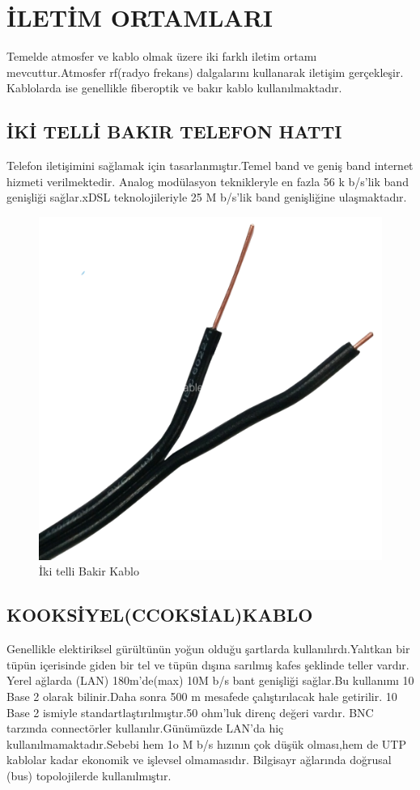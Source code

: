 \section{İLETİM ORTAMLARI}
Temelde atmosfer ve kablo olmak üzere iki farklı iletim ortamı mevcuttur.Atmosfer rf(radyo frekans) dalgalarını kullanarak  iletişim gerçekleşir.
Kablolarda ise genellikle fiberoptik ve bakır kablo kullanılmaktadır.

\subsection{İKİ TELLİ BAKIR TELEFON HATTI }
Telefon iletişimini sağlamak için tasarlanmıştır.Temel band ve geniş band internet hizmeti verilmektedir.
Analog modülasyon teknikleryle en fazla 56 k b/s'lik band genişliği sağlar.xDSL teknolojileriyle 25 M b/s'lik band genişliğine ulaşmaktadır.  
\begin{figure}[!ht]
    \includegraphics{images/ikitellibakirkablo}
   \caption{İki telli Bakir Kablo}
    \label{fig:iki_telli_bakir_kablo}
 \end{figure}

 \subsection{KOOKSİYEL(CCOKSİAL)KABLO}
 Genellikle elektiriksel gürültünün yoğun olduğu şartlarda kullanılırdı.Yalıtkan bir tüpün içerisinde  giden bir tel ve tüpün dışına sarılmış kafes şeklinde teller vardır.
 Yerel ağlarda (LAN) 180m'de(max) 10M b/s bant genişliği sağlar.Bu kullanımı 10 Base 2 olarak bilinir.Daha sonra 500 m mesafede çalıştırılacak hale getirilir. 10 Base 2 ismiyle standartlaştırılmıştır.50 ohm'luk direnç değeri vardır.
 BNC tarzında connectörler kullanılır.Günümüzde LAN'da hiç kullanılmamaktadır.Sebebi hem 1o M b/s  hızının çok düşük olması,hem de UTP kablolar kadar ekonomik ve işlevsel olmamasıdır.
 Bilgisayr ağlarında doğrusal (bus) topolojilerde kullanılmıştır. 
 
